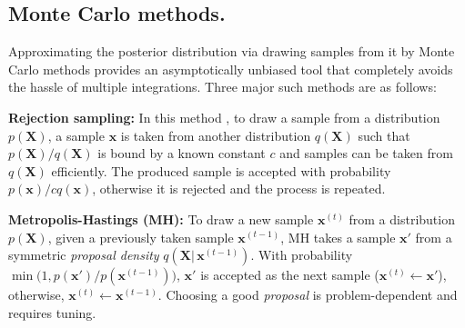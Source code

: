 \documentclass[]{article}
\newcommand{\bvec}[1]{\textbf{#1}}
\newcommand{\pr}{p}
\begin{document}
\subsection{Monte Carlo methods.}
Approximating the posterior distribution via drawing samples from it by Monte Carlo methods 
provides an asymptotically unbiased tool that completely avoids the hassle of multiple integrations.%
Three major such methods are as follows:

{\bf Rejection sampling:} 
In this method \citep{hammersley1964monte}, to draw a sample from 
a distribution $p(\bvec{X})$, a sample $\bvec{x}$ is taken from another distribution $q(\bvec{X})$
such that $p(\bvec{X})/q(\bvec{X})$ is bound by a known constant $c$
and samples can be taken from $q(\bvec{X})$ efficiently.
The produced sample is accepted with probability $p(\bvec{x}) / c q(\bvec{x})$, 
otherwise it is rejected and the process is repeated. 

{\bf Metropolis-Hastings (MH):}
To draw a new sample $\bvec{x}^{(t)}$ from a distribution $p(\bvec{X})$, given a previously taken sample $\bvec{x}^{(t-1)}$, 
MH \citep{metropolis1953equation} takes a sample $\bvec{x}'$ from a symmetric \emph{proposal density} $q(\bvec{X} |\, \bvec{x}^{(t-1)})$. 
With probability $\min \big(1, p(\bvec{x}')/p(\bvec{x}^{(t-1)}) \big)$, 
$\bvec{x}'$ is accepted as the next sample ($\bvec{x}^{(t)} \leftarrow \bvec{x}'$), otherwise, $\bvec{x}^{(t)} \leftarrow \bvec{x}^{(t-1)}$. 
Choosing a good \emph{proposal} is problem-dependent and requires tuning. 
\end{document}
